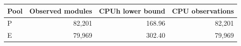 \begin{tabular}{lrrr}
\toprule
Pool & Observed modules & CPUh lower bound & CPU observations\\
\midrule
P & 82,201 & 168.96 & 82,201\\
E & 79,969 & 302.40 & 79,969\\
\bottomrule
\end{tabular}
